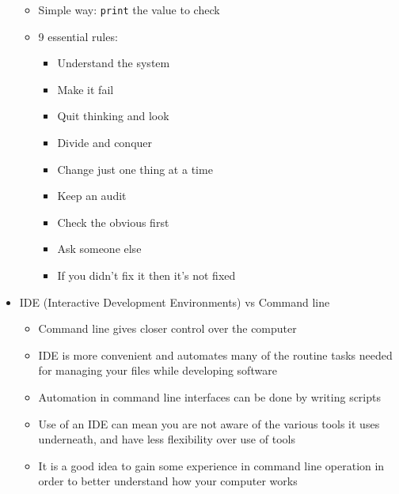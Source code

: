 \documentclass[12pt,openany]{book}
\begin{document}
\begin{itemize}
\begin{itemize}
        \item Simple way: \texttt{print} the value to check
        \item 9 essential rules:
        \begin{itemize}
            \item Understand the system
            \item Make it fail
            \item Quit thinking and look
            \item Divide and conquer
            \item Change just one thing at a time
            \item Keep an audit 
            \item Check the obvious first
            \item Ask someone else
            \item If you didn’t fix it then it’s not fixed
        \end{itemize}
    \end{itemize}
    \item IDE (Interactive Development Environments) vs Command line
    \begin{itemize}
        \item Command line gives closer control over the computer
        \item IDE is more convenient and automates many of the routine tasks needed for managing your files while developing software
        \item Automation in command line interfaces can be done by writing scripts
        \item Use of an IDE can mean you are not aware of the various tools it uses underneath, and have less flexibility over use of tools 
        \item It is a good idea to gain some experience in command line operation in order to better understand how your computer works
    \end{itemize}
\end{itemize}
\end{document}
